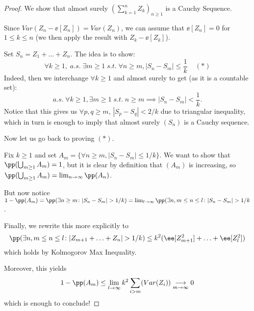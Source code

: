 \documentclass[../main.tex]{subfiles}
\begin{document}
  \begin{proof}
    We show that almost surely $(\sum_{k=1}^n Z_k)_{n \geq 1}$ is a Cauchy
    Sequence.
    \vspace{0.4em}

    Since $Var(Z_n - \ee[Z_n]) = Var(Z_n)$, we can assume that $\ee[Z_n] = 0$
    for $1 \leq k \leq n$ (we then apply the result with $Z_k - \ee[Z_k]$).

    Set $S_n = Z_1 + \ldots + Z_n$. The idea is to show:
    \[
    \forall k \geq 1, \; a.s. \; \exists m \geq 1 \; s.t. \; \forall n \geq m, |S_n -
    S_m| \leq \frac{1}{k}  \;\;\;\;(\ast) 
    \] 
    Indeed, then we interchange $\forall k \geq 1$ and almost surely to get
    (as it is a countable set):
    \[
    a.s. \; \forall k \geq 1, \exists m \geq 1 \; s.t. \; n \geq m \implies
    |S_n - S_m| < \frac{1}{k} 
    .\] 
    Notice that this gives us $\forall p, q \geq m$, $|S_p - S_q| < 2/k$ due
    to triangular inequality, which in turn is enough to imply that almost
    surely $(S_n)$ is a Cauchy sequence.

    \vspace{1em}

    Now let us go back to proving $(\ast)$. 

    \vspace{0.2em}

    Fix $k \geq 1$ and set $A_m =  \{
      \forall n \geq m, |S_n - S_m| \leq 1/k\} $. We want to show that
    $\pp(\bigcup_{m \geq 1} A_m) = 1$, but it is clear by definition that
    $(A_m)$ is increasing, so $\pp(\bigcup_{m \geq 1} A_m) = \lim_{n \to
    \infty}\pp(A_n)$.

    \vspace{0.2em}

    But now notice $1 - \pp(A_m) = \pp(\exists n \geq m \colon |S_n - S_m| >
    1/k) = \lim_{l \to \infty} \pp(\exists n, m \leq n \leq l \colon |S_n -
    S_m| > 1/k$. 

    \vspace{0.2em}

    Finally, we rewrite this more explicitly to 
    \begin{align*}
      \pp(\exists n, m \leq n \leq l \colon |Z_{m +1} + \ldots + Z_n| > 1/k)
      \leq k^2 (\ee[Z_{m+1}^2] + \ldots + \ee[Z_{l}^2])
    \end{align*} 
    which holds by Kolmogorov Max Inequality.
    \vspace{0.2em}

    Moreover, this yields
    \[
      1 - \pp(A_m) \leq \lim_{l \to \infty} k^2 \sum_{i > m} (Var(Z_i))
      \underset{m \to \infty}{\longrightarrow} 0
    \] 
    which is enough to conclude!
   \end{proof}
\end{document}
